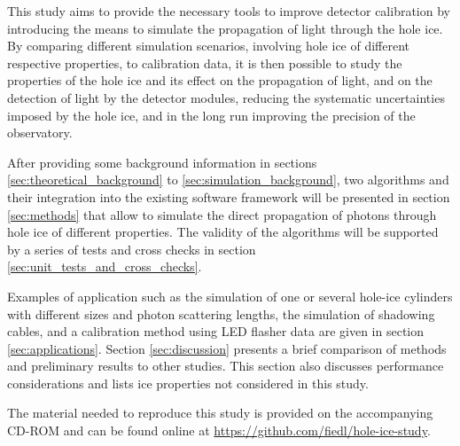 This study aims to provide the necessary tools to improve detector calibration by introducing the means to simulate the propagation of light through the hole ice. By comparing different simulation scenarios, involving hole ice of different respective properties, to calibration data, it is then possible to study the properties of the hole ice and its effect on the propagation of light, and on the detection of light by the detector modules, reducing the systematic uncertainties imposed by the hole ice, and in the long run improving the precision of the \icecube observatory.

After providing some background information in sections \ref{sec:theoretical_background} to \ref{sec:simulation_background}, two algorithms and their integration into the existing \icecube software framework will be presented in section \ref{sec:methods} that allow to simulate the direct propagation of photons through hole ice of different properties. The validity of the algorithms will be supported by a series of tests and cross checks in section \ref{sec:unit_tests_and_cross_checks}.

Examples of application such as the simulation of one or several hole-ice cylinders with different sizes and photon scattering lengths, the simulation of shadowing cables, and a calibration method using LED flasher data are given in section \ref{sec:applications}. Section \ref{sec:discussion} presents a brief comparison of methods and preliminary results to other studies. This section also discusses performance considerations and lists ice properties not considered in this study.

The material needed to reproduce this study is provided on the accompanying CD-ROM and can be found online at \url{https://github.com/fiedl/hole-ice-study}.


